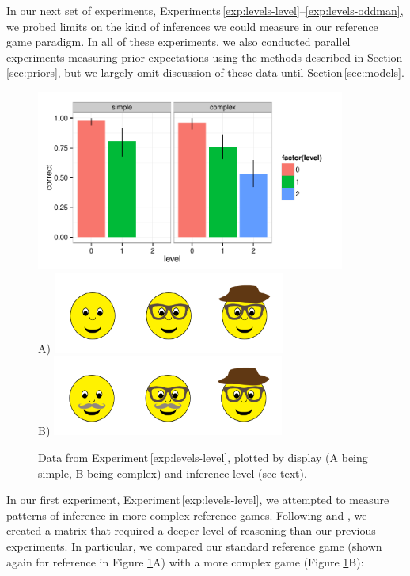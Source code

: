 \documentclass[man,noapacite]{apa2}
\newcounter{Experiment}
\newcommand{\exptref}[1]{Experiment\,\ref{#1}}
\newcommand{\exptrefrange}[2]{Experiments\,\ref{#1}--\ref{#2}}
\newcommand{\secref}[1]{Section\,\ref{#1}}
\begin{document}
In our next set of experiments, \exptrefrange{exp:levels-level}{exp:levels-oddman}, we probed limits on the kind of inferences we could measure in our reference game paradigm. In all of these experiments, we also conducted parallel experiments measuring prior expectations using the methods described in \secref{sec:priors}, but we largely omit discussion of these data until \secref{sec:models}.


 \begin{figure}[t]
  \centering
  \includegraphics[width=4in]{../plots/3-levels-levels.pdf}\\
  A) \includegraphics[width=3in]{figures/hatglasses.pdf}\\
  B) \includegraphics[width=3in]{figures/levels-levels-stim.pdf}
  \caption{\label{fig:levels-level} Data from \exptref{exp:levels-level}, plotted by display (A being simple, B being complex) and inference level (see text).}
\end{figure}


In our first experiment, \exptref{exp:levels-level}, we attempted to measure patterns of inference in more complex reference games. Following  and , we created a matrix that required a deeper level of reasoning than our previous experiments. In particular, we compared our standard reference game (shown again for reference in Figure \ref{fig:levels-level}A) with a more complex game (Figure \ref{fig:levels-level}B):
\end{document}
